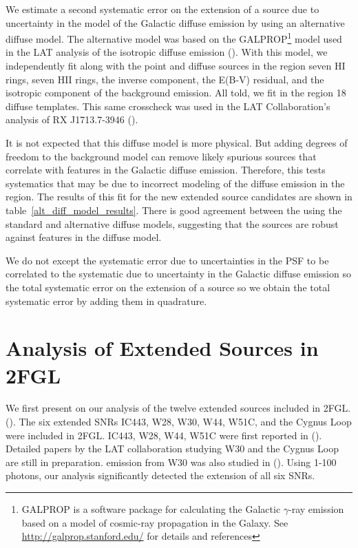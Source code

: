 \documentclass[12pt,preprint]{aastex}
\newcommand{\gev}{\text{GeV}\xspace}
\newcommand{\ts}{\text{TS}\xspace}
\begin{document}

We estimate a second systematic error on the extension of a source
due to uncertainty in the model of the Galactic diffuse emission by
using an alternative diffuse model. The alternative model was based on
the GALPROP\footnote{GALPROP is a software package for calculating the
Galactic $\gamma$-ray emission based on a model of cosmic-ray propagation
in the Galaxy. See \url{http://galprop.stanford.edu/} for details and
references} model used in the LAT analysis of the isotropic diffuse
emission (\cite{isotropic_lat}).  With this model, we independently fit
along with the point and diffuse sources in the region seven HI rings,
seven HII rings, the inverse component, the E(B-V) residual, and the
isotropic component of the background emission.  All told, we fit in
the region 18 diffuse templates.  This same crosscheck was used in the
LAT Collaboration's analysis of RX J1713.7-3946 (\cite{rx_j1713_lat}).

It is not expected that this diffuse model is more physical.
But adding degrees of freedom to the background model can remove
likely spurious sources that correlate with features in the Galactic
diffuse emission.  Therefore, this tests systematics that may be
due to incorrect modeling of the diffuse emission in the region.
The results of this fit for the new extended source candidates are shown
in table~\ref{alt_diff_model_results}. There is good agreement between
the \ts using the standard and alternative diffuse models, suggesting
that the sources are robust against features in the diffuse model.

We do not except the systematic error due to uncertainties in the PSF to
be correlated to the systematic due to uncertainty in the Galactic diffuse
emission so the total systematic error on the extension of a source so
we obtain the total systematic error by adding them in quadrature.

\section{Analysis of Extended Sources in 2FGL}
\label{validate_known}


We first present on our analysis of the twelve extended sources
included in 2FGL.
(\cite{second_cat}).
The six extended SNRs IC443, W28, W30, W44, W51C, and the
Cygnus Loop were included in 2FGL.  IC443, W28, W44, W51C were
first reported in (\cite{ic443,w28,w44,w51c}).  Detailed papers by the LAT
collaboration studying W30 and the Cygnus Loop are still in preparation.
\gev emission from W30 was also studied in (\cite{castro_and_slane_2010}).
Using 1-100 \gev photons, our analysis significantly detected the
extension of all six SNRs.
\end{document}
